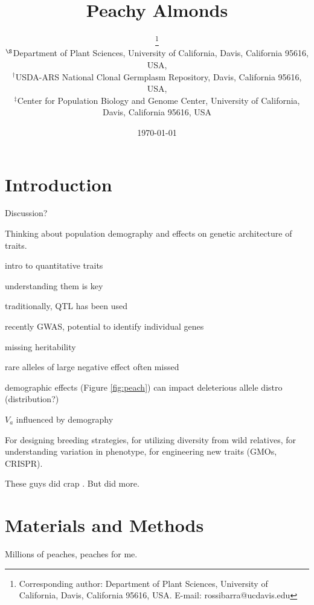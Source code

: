 \documentclass[12pt]{article}
\begin{document}
  \title{Peachy Almonds}
  \author{\small{}\thanks{Corresponding author: Department of Plant Sciences, University of California, Davis, California 95616, USA. E-mail: \mbox{rossibarra@ucdavis.edu}} \\[0.3cm]
     \small\sf $^{\S}$Department of Plant Sciences, University of California, Davis, California 95616, USA,\\
     \small\sf $^{\dag}$USDA-ARS National Clonal Germplasm Repository, Davis, California 95616, USA,\\
     \small\sf $^{\ddag}$Center for Population Biology and Genome Center, University of California, Davis, California 95616, USA\\
}
  \date{\today}

\maketitle

\section*{Introduction}

Discussion?

Thinking about population demography and effects on genetic architecture of traits.

intro to quantitative traits

understanding them is key

traditionally, QTL has been used

recently GWAS, potential to identify individual genes

missing heritability

rare alleles of large negative effect often missed \citep{Thornton2013}


demographic effects (Figure \ref{fig:peach}) can impact deleterious allele distro (distribution?)

$V_a$ influenced by demography \citep{Lohmueller2014}

For designing breeding strategies, for utilizing diversity from wild relatives, for understanding variation in phenotype, for engineering new traits (GMOs, CRISPR).



These guys did crap \citep{Gazave2013}.
But \citet{Thornton2014} did more.




\section*{Materials and Methods}
Millions of peaches, peaches for me.
\end{document}
